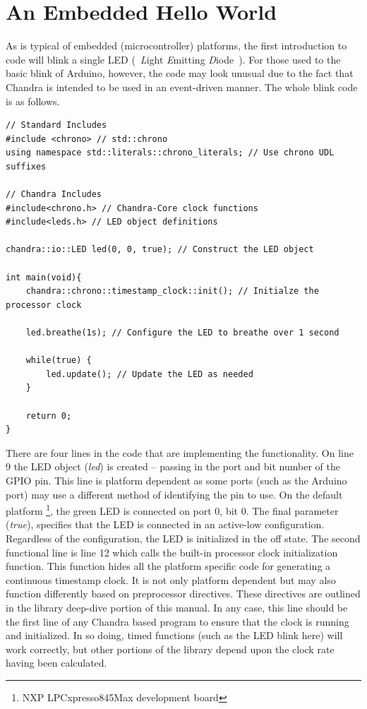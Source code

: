 \documentclass[10pt,letterpaper]{memoir} %
\begin{document}
\section{An Embedded Hello World}
As is typical of embedded (microcontroller) platforms, the first introduction to code will blink a single LED (~\emph{L}ight \emph{E}mitting \emph{D}iode~).  For those used to the basic blink of Arduino, however, the code may look unusual due to the fact that Chandra is intended to be used in an event-driven manner.  The whole blink code is as follows.
\begin{verbatim}
// Standard Includes
#include <chrono> // std::chrono
using namespace std::literals::chrono_literals; // Use chrono UDL suffixes

// Chandra Includes
#include<chrono.h> // Chandra-Core clock functions
#include<leds.h> // LED object definitions

chandra::io::LED led(0, 0, true); // Construct the LED object

int main(void){
	chandra::chrono::timestamp_clock::init(); // Initialze the processor clock

	led.breathe(1s); // Configure the LED to breathe over 1 second
	
	while(true) {
		led.update(); // Update the LED as needed
	}
	
	return 0;
}
\end{verbatim}
There are four lines in the code that are implementing the functionality.  On line 9 the LED object (\emph{led}) is created -- passing in the port and bit number of the GPIO pin.  This line is platform dependent as some ports (such as the Arduino port) may use a different method of identifying the pin to use.  On the default platform \footnote{NXP LPCxpresso845Max development board}, the green LED is connected on port 0, bit 0.  The final parameter (\emph{true}), specifies that the LED is connected in an active-low configuration.  Regardless of the configuration, the LED is initialized in the off state.  The second functional line is line 12 which calls the built-in processor clock initialization function.  This function hides all the platform specific code for generating a continuous timestamp clock.  It is not only platform dependent but may also function differently based on preprocessor directives.  These directives are outlined in the library deep-dive portion of this manual.  In any case, this line should be the first line of any Chandra based program to ensure that the clock is running and initialized.  In so doing, timed functions (such as the LED blink here) will work correctly, but other portions of the library depend upon the clock rate having been calculated.
\end{document}
